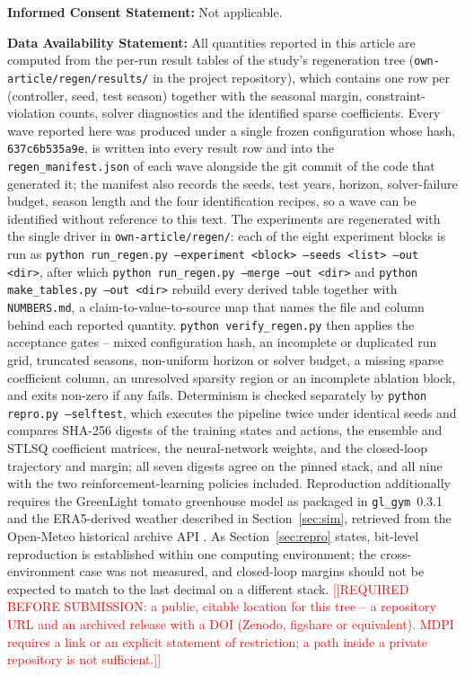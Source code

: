 \noindent\textbf{Informed Consent Statement:} Not applicable.

\noindent\textbf{Data Availability Statement:}
All quantities reported in this article are computed from the per-run result
tables of the study's regeneration tree (\texttt{own-article/regen/results/} in
the project repository), which contains one row per (controller, seed, test
season) together with the seasonal margin, constraint-violation counts, solver
diagnostics and the identified sparse coefficients. Every wave reported here was
produced under a single frozen configuration whose hash,
\texttt{637c6b535a9e}, is written into every result row and into the
\texttt{regen\_manifest.json} of each wave alongside the git commit of the code
that generated it; the manifest also records the seeds, test years, horizon,
solver-failure budget, season length and the four identification recipes, so a
wave can be identified without reference to this text. The experiments are
regenerated with the single driver in \texttt{own-article/regen/}: each of the
eight experiment blocks is run as \texttt{python run\_regen.py --experiment
<block> --seeds <list> --out <dir>}, after which \texttt{python run\_regen.py
--merge --out <dir>} and \texttt{python make\_tables.py --out <dir>} rebuild
every derived table together with \texttt{NUMBERS.md}, a claim-to-value-to-source
map that names the file and column behind each reported quantity. \texttt{python
verify\_regen.py} then applies the acceptance gates -- mixed configuration hash,
an incomplete or duplicated run grid, truncated seasons, non-uniform horizon or
solver budget, a missing sparse coefficient column, an unresolved sparsity
region or an incomplete ablation block, and exits non-zero if any fails.
Determinism is checked separately by \texttt{python repro.py --selftest}, which
executes the pipeline twice under identical seeds and compares SHA-256 digests of
the training states and actions, the ensemble and STLSQ coefficient matrices, the
neural-network weights, and the closed-loop trajectory and margin; all seven
digests agree on the pinned stack, and all nine with the two reinforcement-learning
policies included. Reproduction additionally requires the GreenLight tomato
greenhouse model as packaged in \texttt{gl\_gym}~0.3.1 \cite{katzin2020,vanlaatum2025}
and the ERA5-derived weather described in Section~\ref{sec:sim}, retrieved
from the Open-Meteo historical archive API \cite{hersbach2020,openmeteo2023}. As
Section~\ref{sec:repro} states, bit-level reproduction is established within one
computing environment; the cross-environment case was not measured, and closed-loop
margins should not be expected to match to the last decimal on a different stack.
\textcolor{red}{[[REQUIRED BEFORE SUBMISSION: a public, citable location for this
tree -- a repository URL and an archived release with a DOI (Zenodo, figshare or
equivalent). MDPI requires a link or an explicit statement of restriction; a path
inside a private repository is not sufficient.]]}

